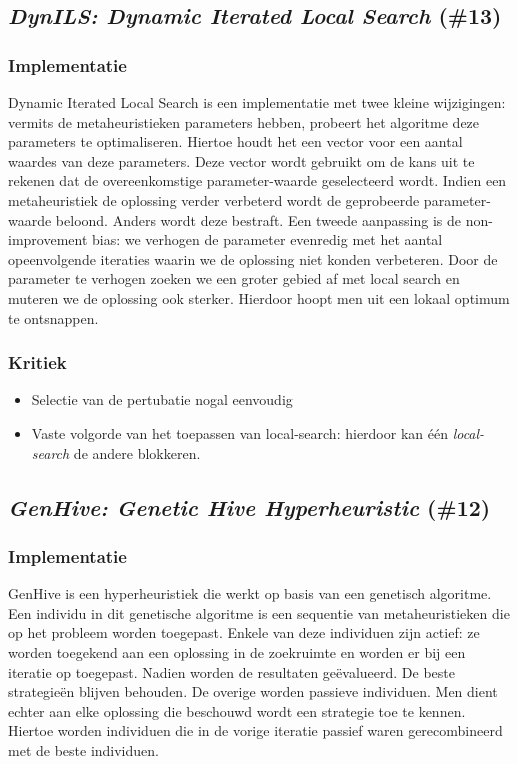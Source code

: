 \subsection{\emph{DynILS: Dynamic Iterated Local Search} (\#13)}
\label{sss:dyn-ils}
\subsubsection{Implementatie}
Dynamic Iterated Local Search\cite{chesc-dynils,journals/orsnz/ksosils} is een implementatie met twee kleine wijzigingen: vermits de metaheuristieken parameters hebben, probeert het algoritme deze parameters te optimaliseren. Hiertoe houdt het een vector voor een aantal waardes van deze parameters. Deze vector wordt gebruikt om de kans uit te rekenen dat de overeenkomstige parameter-waarde geselecteerd wordt. Indien een metaheuristiek de oplossing verder verbeterd wordt de geprobeerde parameter-waarde beloond. Anders wordt deze bestraft. Een tweede aanpassing is de non-improvement bias: we verhogen de parameter evenredig met het aantal opeenvolgende iteraties waarin we de oplossing niet konden verbeteren. Door de parameter te verhogen zoeken we een groter gebied af met local search en muteren we de oplossing ook sterker. Hierdoor hoopt men uit een lokaal optimum te ontsnappen.
\subsubsection{Kritiek}
\begin{itemize}
 \item Selectie van de pertubatie nogal eenvoudig
 \item Vaste volgorde van het toepassen van local-search: hierdoor kan \'e\'en \emph{local-search} de andere blokkeren.
\end{itemize}
\subsection{\emph{GenHive: Genetic Hive Hyperheuristic} (\#12)}
\label{sss:genhive}
\subsubsection{Implementatie}
GenHive\cite{chesc-genhive} is een hyperheuristiek die werkt op basis van een genetisch algoritme. Een individu in dit genetische algoritme is een sequentie van metaheuristieken die op het probleem worden toegepast. Enkele van deze individuen zijn actief: ze worden toegekend aan een oplossing in de zoekruimte en worden er bij een iteratie op toegepast. Nadien worden de resultaten ge\"evalueerd. De beste strategie\"en blijven behouden. De overige worden passieve individuen. Men dient echter aan elke oplossing die beschouwd wordt een strategie toe te kennen. Hiertoe worden individuen die in de vorige iteratie passief waren gerecombineerd met de beste individuen.
